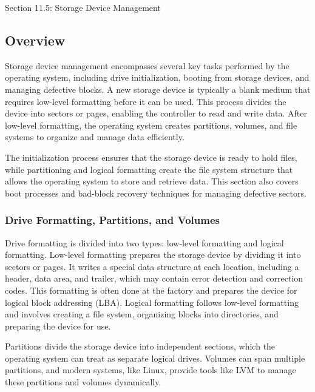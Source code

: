\begin{notes}{Section 11.5: Storage Device Management}

    \subsection*{Overview}
    
    Storage device management encompasses several key tasks performed by the operating system, including drive initialization, booting from storage devices, and managing defective blocks. A new storage 
    device is typically a blank medium that requires low-level formatting before it can be used. This process divides the device into sectors or pages, enabling the controller to read and write data. After 
    low-level formatting, the operating system creates partitions, volumes, and file systems to organize and manage data efficiently.
    
    The initialization process ensures that the storage device is ready to hold files, while partitioning and logical formatting create the file system structure that allows the operating system to store and 
    retrieve data. This section also covers boot processes and bad-block recovery techniques for managing defective sectors.

    \subsubsection*{Drive Formatting, Partitions, and Volumes}
    
    Drive formatting is divided into two types: low-level formatting and logical formatting. Low-level formatting prepares the storage device by dividing it into sectors or pages. It writes a special data 
    structure at each location, including a header, data area, and trailer, which may contain error detection and correction codes. This formatting is often done at the factory and prepares the device for 
    logical block addressing (LBA). Logical formatting follows low-level formatting and involves creating a file system, organizing blocks into directories, and preparing the device for use.
    
    Partitions divide the storage device into independent sections, which the operating system can treat as separate logical drives. Volumes can span multiple partitions, and modern systems, like Linux, 
    provide tools like LVM to manage these partitions and volumes dynamically.

    \begin{highlight}
    

\end{highlight}
\end{notes}
